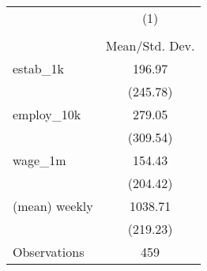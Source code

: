 {
\def\sym#1{\ifmmode^{#1}\else\(^{#1}\)\fi}
\begin{tabular}{l*{1}{c}}
\hline\hline
                    &\multicolumn{1}{c}{(1)}\\
                    &\multicolumn{1}{c}{}\\
                    &Mean/Std. Dev.\\
\hline
estab\_1k            &      196.97\\
                    &    (245.78)\\
employ\_10k          &      279.05\\
                    &    (309.54)\\
wage\_1m             &      154.43\\
                    &    (204.42)\\
(mean) weekly       &     1038.71\\
                    &    (219.23)\\
\hline
Observations        &         459\\
\hline\hline
\end{tabular}
}
